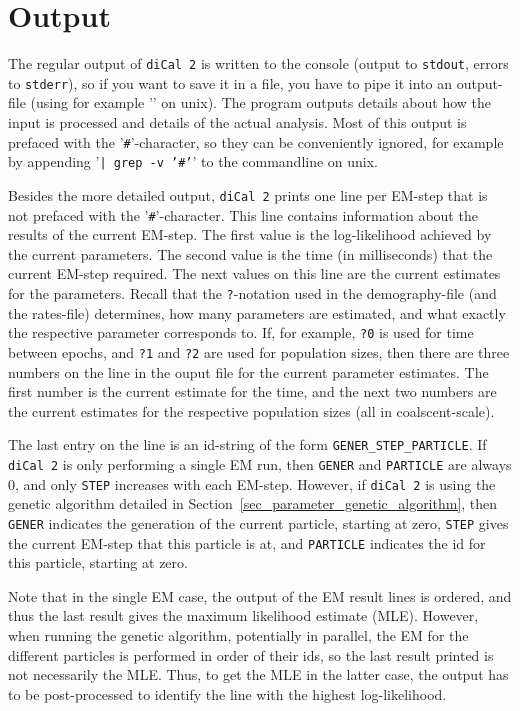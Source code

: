 \documentclass{article}
\numberwithin{equation}{section}
\begin{document}
\section{Output}
\label{sec_output}

The regular output of \texttt{diCal 2} is written to the console (output to \texttt{stdout}, errors to \texttt{stderr}), so if you want to save it in a file, you have to pipe it into an output-file (using for example '\texttt{}' on unix). The program outputs details about how the input is processed and details of the actual analysis. Most of this output is prefaced with the '\texttt{\#}'-character, so they can be conveniently ignored, for example by appending '\texttt{| grep -v '\#'}' to the commandline on unix.

Besides the more detailed output, \texttt{diCal 2} prints one line per EM-step that is not prefaced with the '\texttt{\#}'-character. This line contains information about the results of the current EM-step. The first value is the log-likelihood achieved by the current parameters. The second value is the time (in milliseconds) that the current EM-step required. The next values on this line are the current estimates for the parameters. Recall that the \texttt{?}-notation used in the demography-file (and the rates-file) determines, how many parameters are estimated, and what exactly the respective parameter corresponds to. If, for example, \texttt{?0} is used for time between epochs, and \texttt{?1} and \texttt{?2} are used for population sizes, then there are three numbers on the line in the ouput file for the current parameter estimates. The first number is the current estimate for the time, and the next two numbers are the current estimates for the respective population sizes (all in coalscent-scale).

The last entry on the line is an id-string of the form \texttt{GENER\_STEP\_PARTICLE}. If \texttt{diCal 2} is only performing a single EM run, then \texttt{GENER} and \texttt{PARTICLE} are always 0, and only \texttt{STEP} increases with each EM-step. However, if \texttt{diCal 2} is using the genetic algorithm detailed in Section~\ref{sec_parameter_genetic_algorithm}, then \texttt{GENER} indicates the generation of the current particle, starting at zero, \texttt{STEP} gives the current EM-step that this particle is at, and \texttt{PARTICLE} indicates the id for this particle, starting at zero.

Note that in the single EM case, the output of the EM result lines is ordered, and thus the last result gives the maximum likelihood estimate (MLE). However, when running the genetic algorithm, potentially in parallel, the EM for the different particles is performed in order of their ids, so the last result printed is not necessarily the MLE. Thus, to get the MLE in the latter case, the output has to be post-processed to identify the line with the highest log-likelihood.
\end{document}
